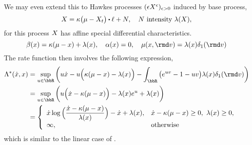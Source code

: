 \begin{example}
  We may even extend this to Hawkes processes $(\epsilon X^\epsilon)_{\epsilon>0}$ induced by base process,
  \begin{equation*}
    \X = \kappa\big(\mu- \X_t \big) \shortInt \leb + \N, \quad \N \text{ intensity } \affInt(\X),
  \end{equation*}
  for this process $X$ has affine special differential characteristics.
  \begin{equation*}
    \affDrift(\stateVar) = \kappa(\mu - \stateVar) + \affInt(\stateVar), \quad
    \affDiff(\stateVar) = 0, \quad
    \affJump(\stateVar, \rmd\markVar) = \affInt(\stateVar) \delta_1(\rmd\markVar)
  \end{equation*}
  The rate function then involves the following expression,
  \begin{align*}
    \ode^*(\diffVar, \stateVar) 
    &= \sup_{\momentVar\in\bbR} \bigg( \momentVar\diffVar - \momentVar\Big(\kappa(\mu - \stateVar) - \affInt(\stateVar)\Big) - \int_\bbR \big( e^{\momentVar\markVar} - 1 - \momentVar\markVar \big) \affInt(\stateVar) \delta_1(\rmd\markVar) \bigg) \\
    &= \sup_{\momentVar\in\bbR} \bigg( \momentVar\Big(\diffVar - \kappa(\mu-\stateVar)\Big) - \affInt(\stateVar)e^\momentVar + \affInt(\stateVar) \bigg) \\
    &= \left\{\begin{array}{ll}
      \displaystyle \diffVar \log\Big(\frac{\diffVar-\kappa(\mu-\stateVar)}{\affInt(\stateVar)}\Big) - \diffVar + \affInt(\stateVar), & \diffVar - \kappa(\mu-\stateVar) \geq 0, ~ \affInt(\stateVar) \geq 0, \\
      \infty, & \text{otherwise}
    \end{array}\right.
  \end{align*}
  which is similar to the linear case of \cite{Gao2018b}.
\end{example}
